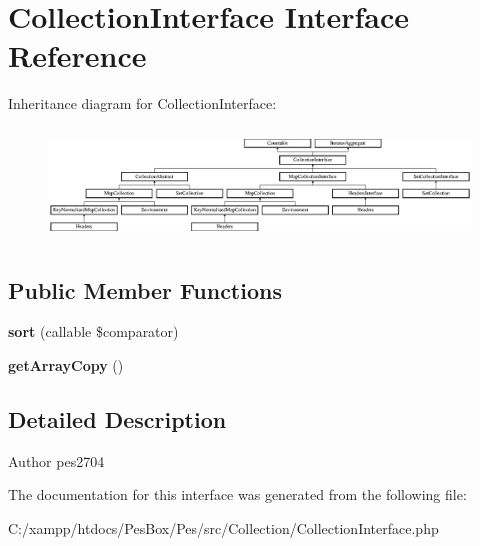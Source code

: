 \hypertarget{interface_pes_1_1_collection_1_1_collection_interface}{}\section{Collection\+Interface Interface Reference}
\label{interface_pes_1_1_collection_1_1_collection_interface}
Inheritance diagram for Collection\+Interface\+:\begin{figure}[H]
\begin{center}
\leavevmode
\includegraphics[height=3.010753cm]{interface_pes_1_1_collection_1_1_collection_interface}
\end{center}
\end{figure}
\subsection*{Public Member Functions}
\begin{DoxyCompactItemize}
\item 
\mbox{\label{interface_pes_1_1_collection_1_1_collection_interface_ac3d1855cff23b99e728759a333684eb2}} 
{\bfseries sort} (callable \$comparator)
\item 
\mbox{\label{interface_pes_1_1_collection_1_1_collection_interface_a9c9bae4e44ee76a926fa7ecdc49dd8b5}} 
{\bfseries get\+Array\+Copy} ()
\end{DoxyCompactItemize}


\subsection{Detailed Description}
\begin{DoxyAuthor}{Author}
pes2704 
\end{DoxyAuthor}


The documentation for this interface was generated from the following file\+:\begin{DoxyCompactItemize}
\item 
C\+:/xampp/htdocs/\+Pes\+Box/\+Pes/src/\+Collection/Collection\+Interface.\+php\end{DoxyCompactItemize}

